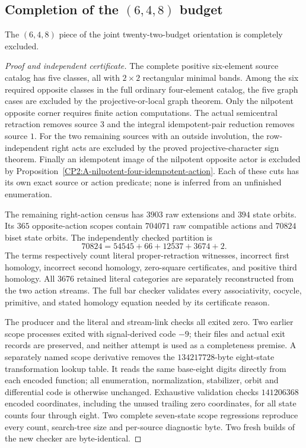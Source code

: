 \subsection{Completion of the $(6,4,8)$ budget}

\begin{proposition}
\label{CP2:A-oriented-eighteen-six-four-eight}
The $(6,4,8)$ piece of the joint twenty-two-budget orientation is
completely excluded.
\end{proposition}
\begin{proof}[Proof and independent certificate]
The complete positive six-element source catalog has five classes,
all with $2\times2$ rectangular minimal bands.  Among the six required
opposite classes in the full ordinary four-element catalog, the five
graph cases are excluded by the projective-or-local graph theorem.
Only the nilpotent opposite corner requires finite action computations.
The actual semicentral retraction removes source $3$ and the integral
idempotent-pair reduction removes source $1$.  For the two remaining
sources with an outside involution, the row-independent right acts are
excluded by the proved projective-character sign theorem.  Finally an
idempotent image of the nilpotent opposite actor is excluded by
Proposition~\ref{CP2:A-nilpotent-four-idempotent-action}.  Each of these
cuts has its own exact source or action predicate; none is inferred
from an unfinished enumeration.

The remaining right-action census has $3903$ raw extensions and $394$
state orbits.  Its $365$ opposite-action scopes contain $704071$ raw
compatible actions and $70824$ biset state orbits.  The independently
checked partition is
\[
 70824=54545+66+12537+3674+2.
\]
The terms respectively count literal proper-retraction witnesses,
incorrect first homology, incorrect second homology, zero-square
certificates, and positive third homology.  All $3676$ retained literal
categories are separately reconstructed from the two action streams.
The full bar checker validates every associativity, cocycle, primitive,
and stated homology equation needed by its certificate reason.

The producer and the literal and stream-link checks all exited zero.
Two earlier scope processes exited with signal-derived code $-9$;
their files and actual exit records are preserved, and neither attempt
is used as a completeness premise.  A separately named scope derivative
removes the $134217728$-byte eight-state transformation lookup table.
It reads the same base-eight digits directly from each encoded function;
all enumeration, normalization, stabilizer, orbit and differential code
is otherwise unchanged.  Exhaustive validation checks $141206368$
encoded coordinates, including the unused trailing zero coordinates,
for all state counts four through eight.  Two complete seven-state
scope regressions reproduce every count, search-tree size and per-source
diagnostic byte.  Two fresh builds of the new checker are byte-identical.


\end{proof}
